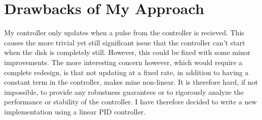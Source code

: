 \documentclass{article}
\begin{document}
\section*{Drawbacks of My Approach}

My controller only updates when a pulse from the controller is recieved. This causes the more trivial yet still significant issue that the controller can't start when the disk is completely still. However, this could be fixed with some minor improvements. The more interesting concern however, which would require a complete redesign, is that not updating at a fixed rate, in addition to having a constant term in the controller, makes mine non-linear. It is therefore hard, if not impossible, to provide any robustness guarantees or to rigorously analyze the performance or stability of the controller. I have therefore decided to write a new implementation using a linear PID controller.
\end{document}
